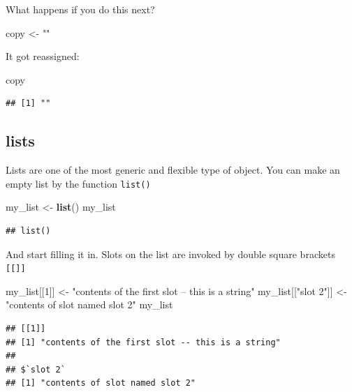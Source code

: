 \documentclass[]{book}
\newenvironment{Shaded}{\begin{snugshade}}{\end{snugshade}}
\newcommand{\KeywordTok}[1]{\textcolor[rgb]{0.13,0.29,0.53}{\textbf{#1}}}
\newcommand{\DecValTok}[1]{\textcolor[rgb]{0.00,0.00,0.81}{#1}}
\newcommand{\StringTok}[1]{\textcolor[rgb]{0.31,0.60,0.02}{#1}}
\newcommand{\NormalTok}[1]{#1}
\theoremstyle{definition}
\theoremstyle{definition}
\theoremstyle{definition}
\theoremstyle{remark}
\begin{document}
What happens if you do this next?

\begin{Shaded}
\begin{Highlighting}[]
\NormalTok{copy <-}\StringTok{ ""}
\end{Highlighting}
\end{Shaded}

It got reassigned:

\begin{Shaded}
\begin{Highlighting}[]
\NormalTok{copy}
\end{Highlighting}
\end{Shaded}

\begin{verbatim}
## [1] ""
\end{verbatim}

\subsection{lists}\label{lists}

Lists are one of the most generic and flexible type of object. You can
make an empty list by the function \texttt{list()}

\begin{Shaded}
\begin{Highlighting}[]
\NormalTok{my_list <-}\StringTok{ }\KeywordTok{list}\NormalTok{()}
\NormalTok{my_list}
\end{Highlighting}
\end{Shaded}

\begin{verbatim}
## list()
\end{verbatim}

And start filling it in. Slots on the list are invoked by double square
brackets \texttt{{[}{[}{]}{]}}

\begin{Shaded}
\begin{Highlighting}[]
\NormalTok{my_list[[}\DecValTok{1}\NormalTok{]] <-}\StringTok{ "contents of the first slot -- this is a string"}
\NormalTok{my_list[[}\StringTok{"slot 2"}\NormalTok{]] <-}\StringTok{ "contents of slot named slot 2"}
\NormalTok{my_list}
\end{Highlighting}
\end{Shaded}

\begin{verbatim}
## [[1]]
## [1] "contents of the first slot -- this is a string"
## 
## $`slot 2`
## [1] "contents of slot named slot 2"
\end{verbatim}
\end{document}
